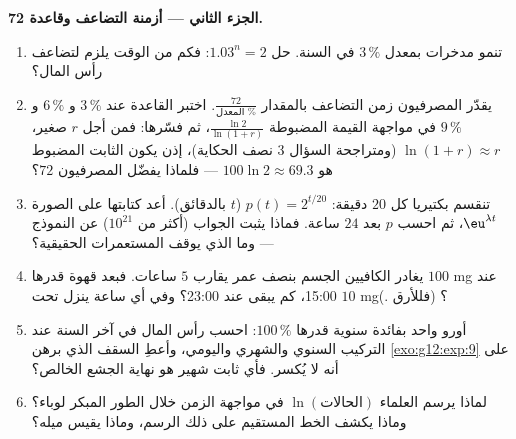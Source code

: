 \begin{problem}
\medskip
\noindent\textbf{الجزء الثاني --- أزمنة التضاعف وقاعدة
72.}
\begin{enumerate}[resume]
  \item تنمو مدخرات بمعدل $3\,\%$ في السنة. حل
        $1.03^n = 2$: فكم من الوقت يلزم لتضاعف رأس المال؟
  \item يقدّر المصرفيون زمن التضاعف بالمقدار
        $\frac{72}{\text{المعدل }\%}$. اختبر القاعدة عند
        $3\,\%$ و $6\,\%$ و $9\,\%$ في مواجهة القيمة المضبوطة
        $\frac{\ln 2}{\ln(1 + r)}$، ثم فسّرها: فمن أجل $r$
        صغير، $\ln(1 + r) \approx r$ (ومتراجحة السؤال 3
        نصف الحكاية)، إذن يكون الثابت المضبوط هو
        $100 \ln 2 \approx 69.3$ --- فلماذا يفضّل المصرفيون
        $72$؟
  \item تنقسم بكتيريا كل $20$ دقيقة:
        $p(t) = 2^{t/20}$ ($t$ بالدقائق). أعد كتابتها على الصورة
        $\eu^{\lambda t}$، ثم احسب $p$ بعد $24$ ساعة.
        فماذا يثبت الجواب (أكثر من $10^{21}$) عن
        النموذج --- وما الذي يوقف المستعمرات الحقيقية؟
  \item يغادر الكافيين الجسم بنصف عمر يقارب $5$
        ساعات. فبعد قهوة قدرها $100$ mg عند 15:00، كم
        يبقى عند 23:00؟ وفي أي ساعة ينزل تحت
        $10$ mg؟ (فللأرق .)
  \item أورو واحد بفائدة سنوية قدرها $100\,\%$: احسب
        رأس المال في آخر السنة عند التركيب السنوي والشهري واليومي،
        وأعطِ السقف الذي برهن
        \cref{exo:g12:exp:9} على أنه لا يُكسر. فأي ثابت شهير
        هو نهاية الجشع الخالص؟
  \item لماذا يرسم العلماء $\ln(\text{الحالات})$ في مواجهة
        الزمن خلال الطور المبكر لوباء؟ وماذا يكشف
        الخط المستقيم على ذلك الرسم، وماذا يقيس ميله؟
\end{enumerate}


\end{problem}
